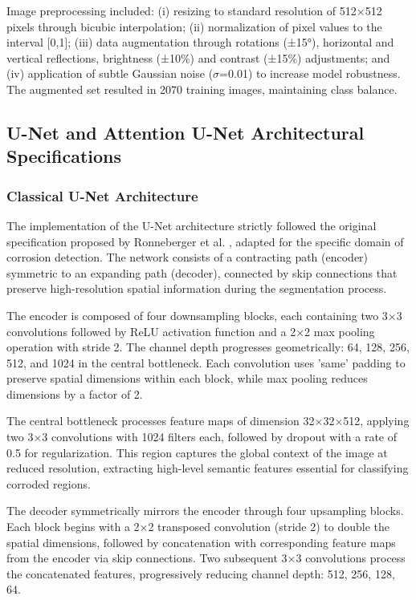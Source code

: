 \documentclass[12pt,a4paper,twoside]{article}
\begin{document}
Image preprocessing included: (i) resizing to standard resolution of 512×512 pixels through bicubic interpolation; (ii) normalization of pixel values to the interval [0,1]; (iii) data augmentation through rotations (±15°), horizontal and vertical reflections, brightness (±10\%) and contrast (±15\%) adjustments; and (iv) application of subtle Gaussian noise ($\sigma$=0.01) to increase model robustness. The augmented set resulted in 2070 training images, maintaining class balance.

\subsection{U-Net and Attention U-Net Architectural Specifications}
\label{subsec:architectures}

\subsubsection{Classical U-Net Architecture}
\label{subsubsec:classical_unet}

The implementation of the U-Net architecture strictly followed the original specification proposed by Ronneberger et al. \cite{ronneberger2015u}, adapted for the specific domain of corrosion detection. The network consists of a contracting path (encoder) symmetric to an expanding path (decoder), connected by skip connections that preserve high-resolution spatial information during the segmentation process.

The encoder is composed of four downsampling blocks, each containing two 3×3 convolutions followed by ReLU activation function and a 2×2 max pooling operation with stride 2. The channel depth progresses geometrically: 64, 128, 256, 512, and 1024 in the central bottleneck. Each convolution uses 'same' padding to preserve spatial dimensions within each block, while max pooling reduces dimensions by a factor of 2.

The central bottleneck processes feature maps of dimension 32×32×512, applying two 3×3 convolutions with 1024 filters each, followed by dropout with a rate of 0.5 for regularization. This region captures the global context of the image at reduced resolution, extracting high-level semantic features essential for classifying corroded regions.

The decoder symmetrically mirrors the encoder through four upsampling blocks. Each block begins with a 2×2 transposed convolution (stride 2) to double the spatial dimensions, followed by concatenation with corresponding feature maps from the encoder via skip connections. Two subsequent 3×3 convolutions process the concatenated features, progressively reducing channel depth: 512, 256, 128, 64.
\end{document}
